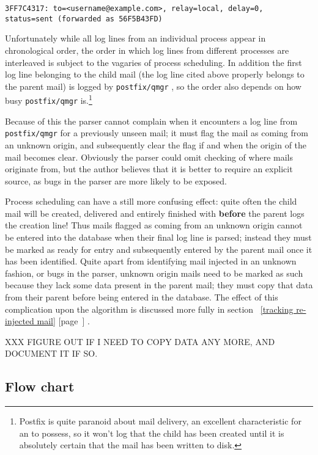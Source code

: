 \documentclass[a4paper,12pt,draft]{article}
\newcommand{\refwithpage}[1]{%
    \empty{}\ref{#1} [page~\pageref{#1}]%
}
\newcommand{\daemon}[1]{%
    \texttt{postfix/#1}%
}
\begin{document}
\texttt{3FF7C4317: to=<username@example.com>, relay=local, \newline
delay=0, status=sent (forwarded as 56F5B43FD)}

Unfortunately while all log lines from an individual process appear in
chronological order, the order in which log lines from different processes
are interleaved is subject to the vagaries of process scheduling.  In
addition the first log line belonging to the child mail (the log line cited
above properly belongs to the parent mail) is logged by \daemon{qmgr}, so
the order also depends on how busy \daemon{qmgr} is.\footnote{Postfix is
quite paranoid about mail delivery, an excellent characteristic for an
\MTA{} to possess, so it won't log that the child has been created until it
is absolutely certain that the mail has been written to disk.}

Because of this the parser cannot complain when it encounters a log line
from \daemon{qmgr} for a previously unseen mail; it must flag the mail as
coming from an unknown origin, and subsequently clear the flag if and when
the origin of the mail becomes clear.  Obviously the parser could omit
checking of where mails originate from, but the author believes that it is
better to require an explicit source, as bugs in the parser are more likely
to be exposed.

Process scheduling can have a still more confusing effect: quite often the
child mail will be created, delivered and entirely finished with
\textbf{before} the parent logs the creation line!  Thus mails flagged as
coming from an unknown origin cannot be entered into the database when
their final log line is parsed; instead they must be marked as ready for
entry and subsequently entered by the parent mail once it has been
identified.  Quite apart from identifying mail injected in an unknown
fashion, or bugs in the parser, unknown origin mails need to be marked as
such because they lack some data present in the parent mail; they must copy
that data from their parent before being entered in the database.  The
effect of this complication upon the algorithm is discussed more fully in
section~\refwithpage{tracking re-injected mail}.

XXX FIGURE OUT IF I NEED TO COPY DATA ANY MORE, AND DOCUMENT IT IF SO\@.


\newpage
\subsection{Flow chart}
\end{document}
